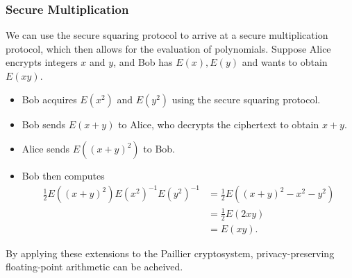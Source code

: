 \subsubsection{Secure Multiplication}
We can use the secure squaring protocol to arrive at a secure multiplication protocol, which then allows for the evaluation of polynomials.
Suppose Alice encrypts integers $x$ and $y$, and Bob has $E(x), E(y)$ and wants to obtain $E(xy)$.
\begin{itemize}
	\item Bob acquires $E(x^2)$ and $E(y^2)$ using the secure squaring protocol.
	\item Bob sends $E(x+y)$ to Alice, who decrypts the ciphertext to obtain $x+y$.
	\item Alice sends $E((x+y)^2)$ to Bob.
	\item Bob then computes
	\begin{align*}
		\frac{1}{2}E((x+y)^2)E(x^2)^{-1}E(y^2)^{-1} &= \frac{1}{2}E((x+y)^2 - x^2 - y^2)\\
		&= \frac{1}{2}E(2xy)\\
		&= E(xy).
	\end{align*}
\end{itemize}

By applying these extensions to the Paillier cryptosystem, privacy-preserving floating-point arithmetic can be acheived.
